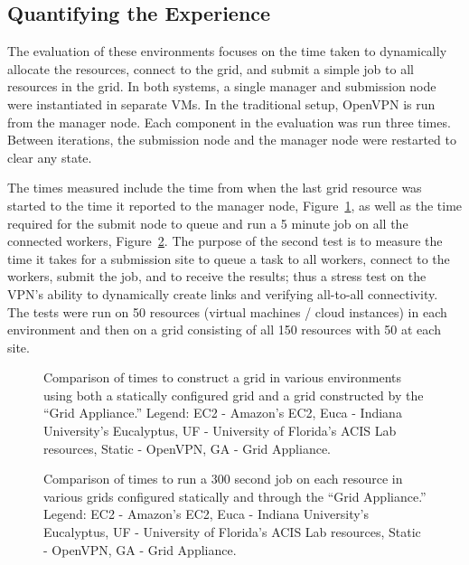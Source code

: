 \subsection{Quantifying the Experience}

The evaluation of these environments focuses on the time taken to dynamically
allocate the resources, connect to the grid, and submit a simple job to all
resources in the grid.  In both systems, a single manager and submission node
were instantiated in separate VMs.  In the traditional setup, OpenVPN is run
from the manager node.  Each component in the evaluation was run three times.
Between iterations, the submission node and the manager node were restarted to
clear any state.

The times measured include the time from when the last grid resource was
started to the time it reported to the manager node, Figure~\ref{fig:connect},
as well as the time required for the submit node to queue and run a 5 minute
job on all the connected workers, Figure~\ref{fig:run}.  The purpose of the
second test is to measure the time it takes for a submission site to queue a
task to all workers, connect to the workers, submit the job, and to receive the
results; thus a stress test on the VPN's ability to dynamically create links
and verifying all-to-all connectivity.  The tests were run on 50 resources
(virtual machines / cloud instances) in each environment and then on a grid
consisting of all 150 resources with 50 at each site.

\begin{figure}
\centering
{}
\caption[Time to construct a grid]{Comparison of times to construct a grid in
various environments using both a statically configured grid and a grid
constructed by the ``Grid Appliance.''  Legend:  EC2 - Amazon's EC2, Euca -
Indiana University's Eucalyptus, UF - University of Florida's ACIS Lab
resources, Static - OpenVPN, GA - Grid Appliance.}
\label{fig:connect}
\end{figure}

\begin{figure}
\centering
{}
\caption[Time to run a job on a grid]{Comparison of times to run a 300 second
job on each resource in various grids configured statically and through the
``Grid Appliance.'' Legend:  EC2 - Amazon's EC2, Euca - Indiana University's
Eucalyptus, UF - University of Florida's ACIS Lab resources, Static - OpenVPN,
GA - Grid Appliance.}
\label{fig:run}
\end{figure}

